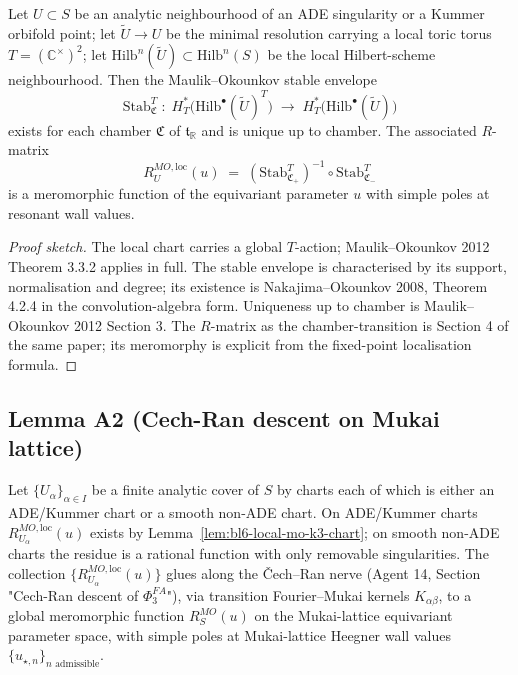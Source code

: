\begin{lemma}
\label{lem:bl6-local-mo-k3-chart}
Let $U \subset S$ be an analytic neighbourhood of an ADE
singularity or a Kummer orbifold point; let $\widetilde U \to U$
be the minimal resolution carrying a local toric torus
$T = (\mathbb C^{\times})^{2}$; let $\mathrm{Hilb}^{n}(\widetilde U)
\subset \mathrm{Hilb}^{n}(S)$ be the local Hilbert-scheme
neighbourhood.  Then the Maulik--Okounkov stable envelope
\[
   \mathrm{Stab}^{T}_{\mathfrak C}
     \;:\;
   H^{*}_{T}\bigl(\mathrm{Hilb}^{\bullet}(\widetilde U)^{T}\bigr)
     \;\longrightarrow\;
   H^{*}_{T}\bigl(\mathrm{Hilb}^{\bullet}(\widetilde U)\bigr)
\]
exists for each chamber $\mathfrak C$ of $\mathfrak t_{\mathbb R}$
and is unique up to chamber.  The associated $R$-matrix
\[
   R^{MO, \mathrm{loc}}_{U}(u)
     \;=\;
   (\mathrm{Stab}^{T}_{\mathfrak C_+})^{-1}
     \circ \mathrm{Stab}^{T}_{\mathfrak C_-}
\]
is a meromorphic function of the equivariant parameter $u$ with
simple poles at resonant wall values.
\end{lemma}

\begin{proof}[Proof sketch]
The local chart carries a global $T$-action; Maulik--Okounkov 2012
Theorem 3.3.2 applies in full.  The stable envelope is characterised
by its support, normalisation and degree; its existence is
Nakajima--Okounkov 2008, Theorem 4.2.4 in the convolution-algebra
form.  Uniqueness up to chamber is Maulik--Okounkov 2012 Section 3.
The $R$-matrix as the chamber-transition is Section 4 of the same
paper; its meromorphy is explicit from the fixed-point localisation
formula.
\end{proof}

\subsection*{Lemma A2 (Cech-Ran descent on Mukai lattice)}

\begin{lemma}
\label{lem:bl6-cech-ran-mo-residues}
Let $\{U_{\alpha}\}_{\alpha \in I}$ be a finite analytic cover of
$S$ by charts each of which is either an ADE/Kummer chart or a
smooth non-ADE chart.  On ADE/Kummer charts
$R^{MO, \mathrm{loc}}_{U_{\alpha}}(u)$ exists by
Lemma~\ref{lem:bl6-local-mo-k3-chart}; on smooth non-ADE charts the
residue is a rational function with only removable singularities.
The collection $\{R^{MO, \mathrm{loc}}_{U_{\alpha}}(u)\}$ glues
along the \v Cech--Ran nerve (Agent 14,
Section "Cech-Ran descent of $\Phi^{FA}_{3}$"), via transition
Fourier--Mukai kernels $K_{\alpha \beta}$, to a global meromorphic
function $R^{MO}_{S}(u)$ on the Mukai-lattice equivariant
parameter space, with simple poles at Mukai-lattice Heegner wall
values
$\{u_{\star, n}\}_{n \text{ admissible}}$.
\end{lemma}

